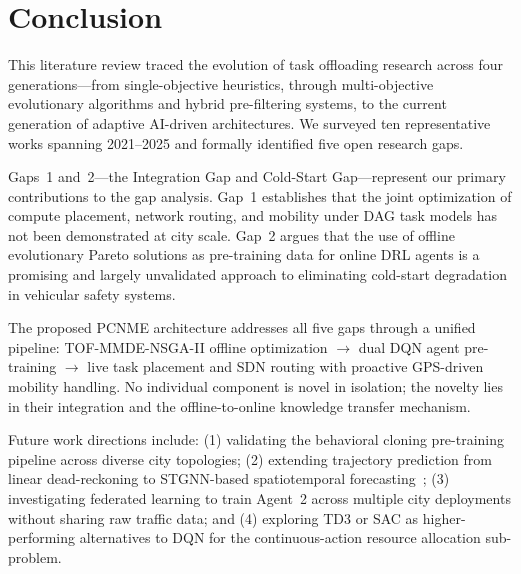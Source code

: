 \documentclass[12pt,a4paper]{article}
\begin{document}

\section{Conclusion}
\label{sec:conclusion}

This literature review traced the evolution of task offloading research across
four generations---from single-objective heuristics, through multi-objective
evolutionary algorithms and hybrid pre-filtering systems, to the current generation
of adaptive AI-driven architectures. We surveyed ten representative works spanning
2021--2025 and formally identified five open research gaps.

Gaps~1 and~2---the Integration Gap and Cold-Start Gap---represent our primary
contributions to the gap analysis. Gap~1 establishes that the joint optimization
of compute placement, network routing, and mobility under DAG task models has
not been demonstrated at city scale. Gap~2 argues that the use of offline
evolutionary Pareto solutions as pre-training data for online DRL agents is a
promising and largely unvalidated approach to eliminating cold-start degradation
in vehicular safety systems.

The proposed PCNME architecture addresses all five gaps through a unified pipeline:
TOF-MMDE-NSGA-II offline optimization $\rightarrow$ dual DQN agent pre-training
$\rightarrow$ live task placement and SDN routing with proactive GPS-driven
mobility handling. No individual component is novel in isolation; the novelty
lies in their integration and the offline-to-online knowledge transfer mechanism.

Future work directions include: (1) validating the behavioral cloning pre-training
pipeline across diverse city topologies; (2) extending trajectory prediction from
linear dead-reckoning to STGNN-based spatiotemporal
forecasting~\cite{zhu2025spatiotemporal}; (3) investigating federated learning
to train Agent~2 across multiple city deployments without sharing raw traffic
data; and (4) exploring TD3 or SAC as higher-performing alternatives to DQN for
the continuous-action resource allocation sub-problem.
\end{document}
